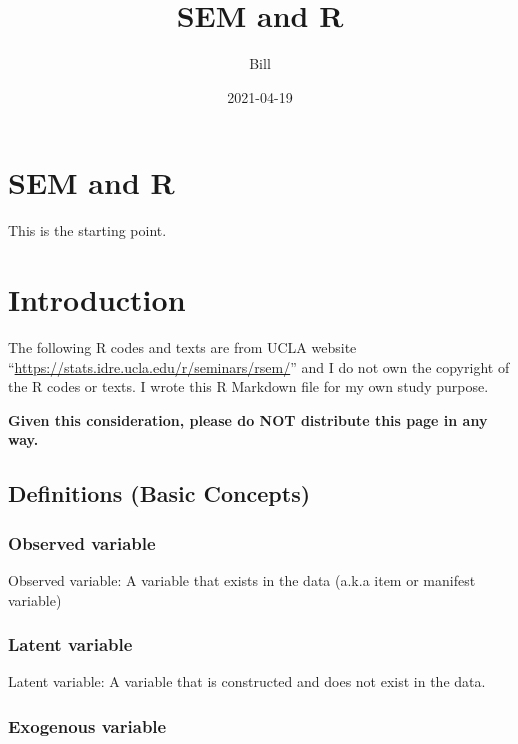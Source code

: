 \documentclass[]{book}
\title{SEM and R}
\author{Bill}
\date{2021-04-19}
\begin{document}
\maketitle

{
\setcounter{tocdepth}{1}
\tableofcontents
}
\hypertarget{sem-and-r}{%
\chapter{SEM and R}\label{sem-and-r}}

This is the starting point.

\hypertarget{intro}{%
\chapter{Introduction}\label{intro}}

The following R codes and texts are from UCLA website ``\url{https://stats.idre.ucla.edu/r/seminars/rsem/}'' and I do not own the copyright of the R codes or texts. I wrote this R Markdown file for my own study purpose.

\textbf{Given this consideration, please do NOT distribute this page in any way.}

\hypertarget{definitions-basic-concepts}{%
\section{Definitions (Basic Concepts)}\label{definitions-basic-concepts}}

\hypertarget{observed-variable}{%
\subsection{Observed variable}\label{observed-variable}}

Observed variable: A variable that exists in the data (a.k.a item or manifest variable)

\hypertarget{latent-variable}{%
\subsection{Latent variable}\label{latent-variable}}

Latent variable: A variable that is constructed and does not exist in the data.

\hypertarget{exogenous-variable}{%
\subsection{Exogenous variable}\label{exogenous-variable}}
\end{document}
